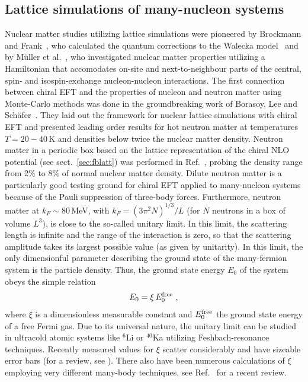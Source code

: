 \documentclass[aps,rmp,nofootinbib,twocolumn,floatfix]{revtex4}
\newcommand{\beq}{\begin{equation}}
\newcommand{\eeq}{\end{equation}}
\begin{document}
\subsection{Lattice simulations of many-nucleon systems}
\label{sec:lattmany}

Nuclear matter studies utilizing lattice simulations were pioneered
by Brockmann and Frank~\cite{Brockmann:1992in}, who calculated the
quantum corrections to the Walecka model~\cite{Serot:1984ey} and
by M\"uller et al.~\cite{Muller:1999cp}, who investigated nuclear
matter properties utilizing a Hamiltonian that accomodates on-site
and next-to-neighbour parts of the central, spin- and isospin-exchange
nucleon-nucleon interactions. 
The first connection between chiral EFT and the
properties of nucleon and neutron matter using Monte-Carlo
methods was done in the groundbreaking work of Borasoy, Lee
and Sch\"afer~\cite{Lee:2004si}. They laid out the framework for
nuclear lattice simulations with chiral EFT and presented leading order
results for hot neutron matter at temperatures $T = 20 - 40\,$K and densities
below twice the nuclear matter density. Neutron matter in a periodic box 
based on the lattice  representation of the chiral NLO potential 
(see sect.~\ref{sec:fblatt}) was performed in Ref.~\cite{Borasoy:2007vk},
probing the 
density range from 2\% to 8\% of normal nuclear matter density. Dilute
neutron matter is a particularly good testing ground for  chiral EFT
applied to many-nucleon systems because of the Pauli suppression of
three-body forces. Furthermore, neutron matter at $k_F \sim 80\,$MeV,
with $k_F = (3\pi^2 N)^{1/3}/L$ (for $N$ neutrons in a box of volume $L^3$),
is close to the so-called unitary limit. In this limit, the scattering
length is infinite and the range of the interaction is zero, so that
the scattering amplitude takes its largest possible value (as given
by unitarity). In this limit,
the only dimensionful parameter describing the ground state of the 
many-fermion system is the
particle density. Thus, the ground state energy $E_0$ of the system
obeys the simple relation
\beq
E_0 = \xi \, E_0^{\rm free}~,
\eeq
where $\xi$ is a dimensionless measurable constant and $ E_0^{\rm free}$
the ground state energy of a free Fermi gas. Due to its universal nature,
the unitary limit can be studied in ultracold atomic systems like
$^6$Li or $^{40}$Ka utilizing Feshbach-resonance techniques. 
Recently measured values for $\xi$ scatter considerably and have 
sizeable error bars (for a  review, see \cite{Giorgini08}). 
There also have been numerous calculations of 
$\xi$ employing very different many-body techniques, see 
Ref.~\cite{Furnstahl:2008df} for a recent review.
\end{document}
